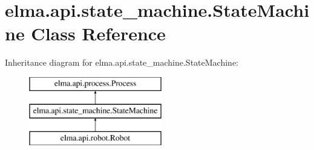\hypertarget{classelma_1_1api_1_1state__machine_1_1StateMachine}{}\section{elma.\+api.\+state\+\_\+machine.\+State\+Machine Class Reference}
\label{classelma_1_1api_1_1state__machine_1_1StateMachine}
Inheritance diagram for elma.\+api.\+state\+\_\+machine.\+State\+Machine\+:\begin{figure}[H]
\begin{center}
\leavevmode
\includegraphics[height=3.000000cm]{classelma_1_1api_1_1state__machine_1_1StateMachine}
\end{center}
\end{figure}
